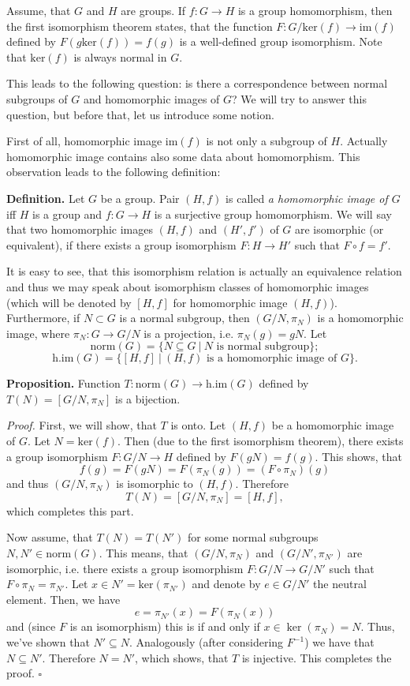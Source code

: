 \documentclass[12pt]{article}
\begin{document}
Assume, that $G$ and $H$ are groups. If $f:G\to H$ is a group homomorphism, then the first isomorphism theorem states, that the function $F:G/\mathrm{ker}(f)\to\mathrm{im}(f)$ defined by $F(g\mathrm{ker}(f))=f(g)$ is a well-defined group isomorphism. Note that $\mathrm{ker}(f)$ is always normal in $G$.

This leads to the following question: is there a correspondence between normal subgroups of $G$ and homomorphic images of $G$? We will try to answer this question, but before that, let us introduce some notion.

First of all, homomorphic image $\mathrm{im}(f)$ is not only a subgroup of $H$. Actually homomorphic image contains also some data about homomorphism. This observation leads to the following definition:

\textbf{Definition.} Let $G$ be a group. Pair $(H,f)$ is called \textit{a homomorphic image of $G$} iff $H$ is a group and $f:G\to H$ is a surjective group homomorphism. We will say that two homomorphic images $(H,f)$ and $(H',f')$ of $G$ are isomorphic (or equivalent), if there exists a group isomorphism $F:H\to H'$ such that $F\circ f=f'$.

It is easy to see, that this isomorphism relation is actually an equivalence relation and thus we may speak about isomorphism classes of homomorphic images (which will be denoted by $[H,f]$ for homomorphic image $(H,f)$). Furthermore, if $N\subset G$ is a normal subgroup, then $(G/N,\pi_{N})$ is a homomorphic image, where $\pi_N:G\to G/N$ is a projection, i.e. $\pi_N(g)=gN$. Let
$$\mathrm{norm}(G)=\{N\subseteq G\ |\ N\mbox{ is normal subgroup}\};$$
$$\mathrm{h.im}(G)=\{[H,f]\ |\ (H,f)\mbox{ is a homomorphic image of }G\}.$$

\textbf{Proposition.} Function $T:\mathrm{norm}(G)\to\mathrm{h.im}(G)$ defined by $T(N)=[G/N,\pi_N]$ is a bijection.

\textit{Proof.} First, we will show, that $T$ is onto. Let $(H,f)$ be a homomorphic image of $G$. Let $N=\mathrm{ker}(f)$. Then (due to the first isomorphism theorem), there exists a group isomorphism $F:G/N\to H$ defined by $F(gN)=f(g)$. This shows, that $$f(g)=F(gN)=F(\pi_N(g))=(F\circ\pi_N)(g)$$ and thus $(G/N,\pi_N)$ is isomorphic to $(H,f)$. Therefore $$T(N)=[G/N,\pi_N]=[H,f],$$
which completes this part.

Now assume, that $T(N)=T(N')$ for some normal subgroups $N,N'\in\mathrm{norm}(G)$. This means, that $(G/N,\pi_N)$ and $(G/N',\pi_{N'})$ are isomorphic, i.e. there exists a group isomorphism $F:G/N\to G/N'$ such that $F\circ\pi_N=\pi_{N'}$. Let $x\in N'=\mathrm{ker}(\pi_{N'})$ and denote by $e\in G/N'$ the neutral element. Then, we have
$$e=\pi_{N'}(x)=F(\pi_N(x))$$
and (since $F$ is an isomorphism) this is if and only if $x\in\ker(\pi_N)=N$. Thus, we've shown that $N'\subseteq N$. Analogously (after considering $F^{-1}$) we have that $N\subseteq N'$. Therefore $N=N'$, which shows, that $T$ is injective. This completes the proof. $\square$
\end{document}
